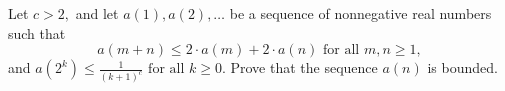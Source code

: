 Let $ c > 2,$ and let $ a(1), a(2), \ldots$ be a sequence of nonnegative real numbers such that\[ a(m + n) \leq 2 \cdot a(m) + 2 \cdot a(n) \text{ for all } m,n \geq 1,
\]
and $ a\left(2^k \right) \leq \frac {1}{(k + 1)^c} \text{ for all } k \geq 0.$ Prove that the sequence $ a(n)$ is bounded.
